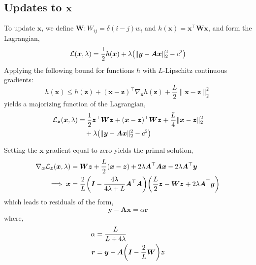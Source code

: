 \documentclass{article}
\numberwithin{equation}{section}
\newcommand{\lh}{\mathopen{}\mathclose\bgroup\left}
\newcommand{\rh}{\aftergroup\egroup\right}
\newcommand{\m}[1]{\boldsymbol{#1}}
\begin{document}
\subsection{Updates to $\m{x}$}
To update $\m{x}$, we define $\m{W} : W_{ij} = \delta(i-j) w_i$
and $h(\m{x}) = \m{x}^\top \m{W} \m{x}$, and form the Lagrangian,
\begin{equation}
\mathcal{L}(\m{x}, \lambda) = \frac{1}{2} h(\m{x})
 + \lambda \lh( \| \m{y} - \m{A} \m{x} \|_2^2 - c^2 \rh)
\end{equation}
Applying the following bound for functions $h$ with $L$-Lipschitz
continuous gradients:
\begin{equation}
h(\m{x}) \le h(\m{z})
 + (\m{x} - \m{z})^\top \nabla_{\m{x}} h(\m{z})
 + \frac{L}{2} \| \m{x} - \m{z} \|_2^2
\end{equation}
yields a majorizing function of the Lagrangian,
\begin{equation}
\begin{aligned}
\mathcal{L}_{\m{z}}(\m{x}, \lambda) &=
 \frac{1}{2} \m{z}^\top \m{W} \m{z}
 + (\m{x} - \m{z})^\top \m{W} \m{z}
 + \frac{L}{4} \| \m{x} - \m{z} \|_2^2
\\ &\quad
 + \lambda \lh( \| \m{y} - \m{A} \m{x} \|_2^2 - c^2 \rh)
\end{aligned}
\end{equation}

Setting the $\m{x}$-gradient equal to zero yields the primal solution,
\begin{equation}
\begin{aligned}
\nabla_{\m{x}} \mathcal{L}_{\m{z}}(\m{x}, \lambda) &=
 \m{W} \m{z} + \frac{L}{2} ( \m{x} - \m{z} )
 +2 \lambda \m{A}^\top \m{A} \m{x}
 -2 \lambda \m{A}^\top \m{y}
\\ \implies
 \m{x} &=
 \frac{2}{L}
 \lh(
  \m{I} - \frac{4\lambda}{4\lambda + L} \m{A}^\top \m{A}
 \rh) \lh(
  \frac{L}{2} \m{z} - \m{W} \m{z} + 2 \lambda \m{A}^\top \m{y}
 \rh)
\end{aligned}
\end{equation}
which leads to residuals of the form,
\begin{equation}
\m{y} - \m{A} \m{x} = \alpha \m{r}
\end{equation}
where,
\begin{equation}
\begin{aligned}
\alpha &= \frac{L}{L + 4 \lambda}
\\
\m{r} &= \m{y} - \m{A} \lh( \m{I} - \frac{2}{L} \m{W} \rh) \m{z}
\end{aligned}
\end{equation}
\end{document}
